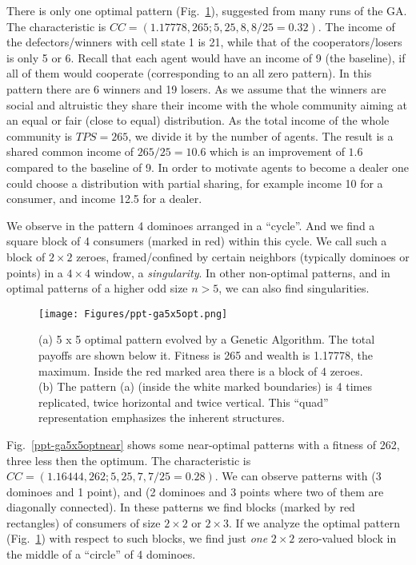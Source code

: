 \documentclass[10pt,a4paper]{article}  %
\begin{document}
There is only one optimal pattern (Fig.~\ref{ppt-ga5x5opt}), suggested from many runs of the GA.
The characteristic is $CC=(1.17778, 265; 5, 25, 8, 8/25=0.32)$. 
The income of the defectors/winners with cell state 1 is 21, while that of the cooperators/losers is only 5 or 6.
Recall that each agent would have an income of 9 (the baseline), 
if all of them would cooperate (corresponding to an all zero pattern).
In this pattern there are 6 winners and 19 losers.
As we assume that the winners are social and altruistic they share their income with the whole community
aiming at an equal or fair (close to equal) distribution.
As the total income of the whole community is $TPS=265$, we divide it by the number of agents.
The result is a shared common income of $265/25=10.6$ which is an improvement of $1.6$ compared to the baseline of 9.
In order to motivate agents to become a dealer one could choose a distribution with partial sharing, for example
income 10 for a consumer, and income 12.5 for a dealer.%

We observe in the pattern 4 dominoes arranged in a  ``cycle''.
And we find a square block of 4 consumers (marked in red) within this cycle. 
We call such a block of $2\times 2$ zeroes, framed/confined by certain neighbors
(typically  dominoes or points) 
in a $4\times 4$ window, a \textit{singularity}.
In other non-optimal patterns, and in optimal patterns of a higher odd size $n >5$, we can also find
singularities. 


\begin{figure}[H] 
\centering

\texttt{[image: Figures/ppt-ga5x5opt.png]}
\caption{
(a) 5 x 5 optimal pattern evolved by a Genetic Algorithm.
The total payoffs are shown below it. 
Fitness is 265 and wealth is 1.17778, the maximum.
Inside the red marked area there is a block of 4 zeroes.
(b)
The pattern (a) (inside the white marked boundaries)
is 4 times replicated, twice horizontal and twice vertical. 
This ``quad'' representation emphasizes the inherent structures.
}
\label{ppt-ga5x5opt}
\end{figure}


Fig.~\ref{ppt-ga5x5optnear} shows some near-optimal patterns with a fitness of 262, three less then the optimum.
The characteristic is $CC=(1.16444, 262; 5, 25, 7, 7/25=0.28)$.  
We can observe patterns with (3 dominoes and 1 point), 
and (2 dominoes and 3 points where two of them are diagonally connected).
In these patterns we find blocks (marked by red rectangles) 
of consumers of size $2 \times 2$ or $2 \times 3$.
If we analyze the optimal pattern (Fig.~\ref{ppt-ga5x5opt}) with respect to such blocks,
we find just \textit{one} $2 \times 2$ zero-valued block in the middle of a ``circle'' of 4 dominoes. 
\end{document}
